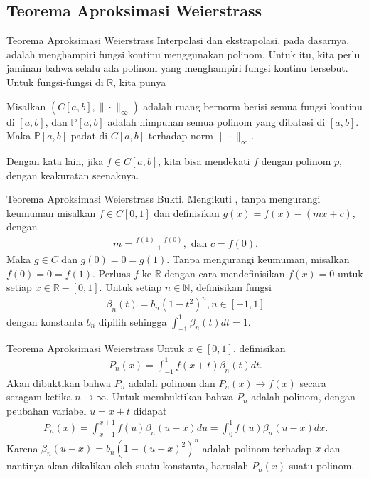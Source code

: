 \documentclass[xcolor={dvipsnames}, 9pt]{beamer}
\begin{document}
	\subsection{Teorema Aproksimasi Weierstrass}
	\begin{frame}{Teorema Aproksimasi Weierstrass}
		Interpolasi dan ekstrapolasi, pada dasarnya, adalah menghampiri fungsi kontinu menggunakan polinom. \newline
		Untuk itu, kita perlu jaminan bahwa selalu ada polinom yang menghampiri fungsi kontinu tersebut. Untuk fungsi-fungsi di $\mathbb{R}$, kita punya \newline
		\begin{theorem}
			Misalkan $(C[a,b],\|\cdot\|_\infty)$ adalah ruang bernorm berisi semua fungsi kontinu di $[a,b]$, dan $\mathbb{P}[a,b]$ adalah himpunan semua polinom yang dibatasi di $[a,b]$. Maka $\mathbb{P}[a,b]$ padat di $C[a,b]$ terhadap norm $\|\cdot\|_\infty$.
		\end{theorem}
		Dengan kata lain, jika $f\in C[a,b]$, kita bisa mendekati $f$ dengan polinom $p$, dengan keakuratan seenaknya.
	\end{frame}
	\begin{frame}{Teorema Aproksimasi Weierstrass}
		Bukti. Mengikuti \cite{Pugh2015Real}, tanpa mengurangi keumuman misalkan $f\in C[0,1]$ dan definisikan $g(x)=f(x)-(mx+c)$, dengan
        \begin{align*}
            m=\frac{f(1)-f(0)}{1}, \text{ dan } c=f(0).
        \end{align*}
        Maka $g\in C$ dan $g(0)=0=g(1)$. Tanpa mengurangi keumuman, misalkan $f(0)=0=f(1)$. \newline
        Perluas $f$ ke $\mathbb{R}$ dengan cara mendefinisikan $f(x)=0$ untuk setiap $x\in\mathbb{R}-[0,1]$. Untuk setiap $n\in\mathbb{N}$, definisikan fungsi
        \begin{align*}
            \beta_n(t) = b_n(1-t^2)^n, n\in [-1,1]
        \end{align*}
        dengan konstanta $b_n$ dipilih sehingga $\int_{-1}^1 \beta_n(t)dt=1$.
	\end{frame}
    \begin{frame}{Teorema Aproksimasi Weierstrass}
        Untuk $x\in[0,1]$, definisikan
        \begin{align*}
            P_n(x) = \int_{-1}^1 f(x+t)\beta_n(t) dt.
        \end{align*}
        Akan dibuktikan bahwa $P_n$ adalah polinom dan $P_n(x)\to f(x)$ secara seragam ketika $n\to\infty$. \newline
        Untuk membuktikan bahwa $P_n$ adalah polinom, dengan peubahan variabel $u=x+t$ didapat
        \begin{align*}
            P_n(x) = \int_{x-1}^{x+1}f(u)\beta_n(u-x)du=\int_0^1 f(u)\beta_n(u-x) dx.
        \end{align*}
        Karena $\beta_n(u-x)=b_n(1-(u-x)^2)^n$ adalah polinom terhadap $x$ dan nantinya akan dikalikan oleh suatu konstanta, haruslah $P_n(x)$ suatu polinom.
    \end{frame}
\end{document}
